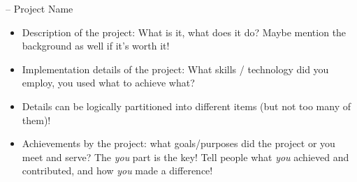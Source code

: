 \cventry
{ -- 
} %
{%
    Project Name%
}
{} %
{} %
{} %
{%
    \begin{itemize}
        \item
            Description of the project:
            What is it,
            what does it do?
            Maybe mention the background as well if it's worth it!
        \item
            Implementation details of the project:
            What skills / technology did you employ,
            you used what to achieve what?
        \item
            Details can be logically partitioned into different items
            (but not too many of them)!
        \item
            Achievements by the project:
            what goals/purposes did the project or you meet and serve?
            The \emph{you} part is the key!
            Tell people what \emph{you} achieved and contributed,
            and how \emph{you} made a difference!
    \end{itemize}
}

